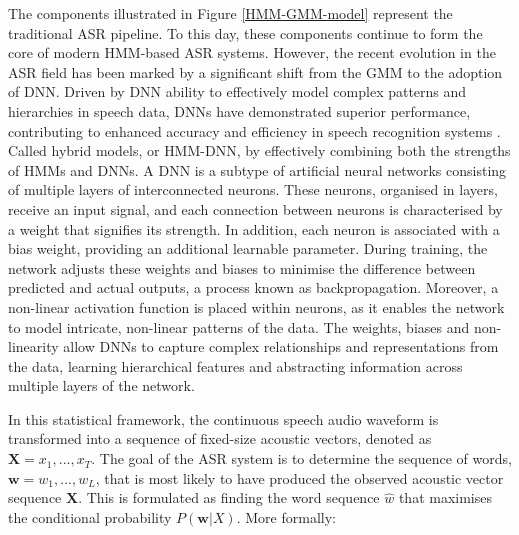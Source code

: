 The components illustrated in Figure \ref{HMM-GMM-model} represent the traditional \ac{ASR} pipeline. To this day, these components continue to form the core of modern \ac{HMM}-based \ac{ASR} systems. However, the recent evolution in the \ac{ASR} field has been marked by a significant shift from the \ac{GMM} to the adoption of \ac{DNN}. Driven by \ac{DNN} ability to effectively model complex patterns and hierarchies in speech data, \acp{DNN} have demonstrated superior performance, contributing to enhanced accuracy and efficiency in speech recognition systems \cite{hmm-dnn}. Called hybrid models, or \ac{HMM-DNN}, by effectively combining both the strengths of \acp{HMM} and \acp{DNN}. A \ac{DNN} is a subtype of artificial neural networks consisting of multiple layers of interconnected neurons. These neurons, organised in layers, receive an input signal, and each connection between neurons is characterised by a weight that signifies its strength. In addition, each neuron is associated with a bias weight, providing an additional learnable parameter. During training, the network adjusts these weights and biases to minimise the difference between predicted and actual outputs, a process known as backpropagation. Moreover, a non-linear activation function is placed within neurons, as it enables the network to model intricate, non-linear patterns of the data. The weights, biases and non-linearity allow \acp{DNN} to capture complex relationships and representations from the data, learning hierarchical features and abstracting information across multiple layers of the network.

In this statistical framework, the continuous speech audio waveform is transformed into a sequence of fixed-size acoustic vectors, denoted as $\boldsymbol{X}=x_1,...,x_T$. The goal of the \ac{ASR} system is to determine the sequence of words, $\boldsymbol{w}=w_1,...,w_L$, that is most likely to have produced the observed acoustic vector sequence $\boldsymbol{X}$. This is formulated as finding the word sequence $\hat{w}$ that maximises the conditional probability $P(\boldsymbol{w}|X)$. More formally:

